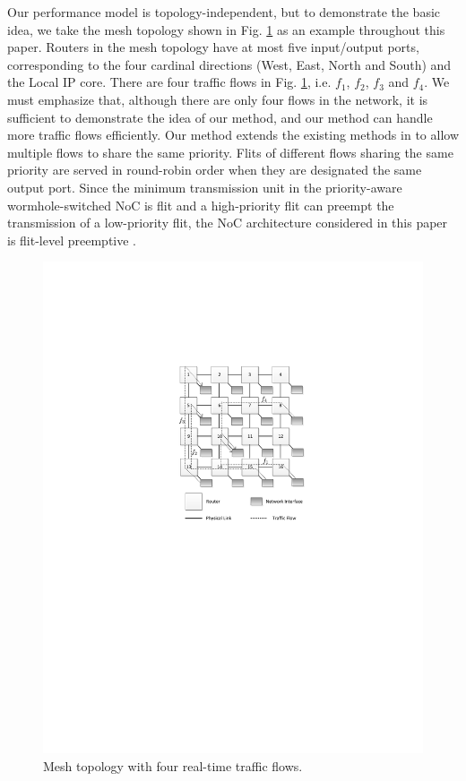\documentclass[preprint]{elsarticle}
\begin{document}
Our performance model is topology-independent, but to demonstrate the basic idea, we take the mesh topology shown in Fig. \ref{topology} as an example throughout this paper. Routers in the mesh topology have at most five input/output ports, corresponding to the four cardinal directions (West, East, North and South) and the Local IP core. There are four traffic flows in Fig. \ref{topology}, i.e. $f_1$, $f_2$, $f_3$ and $f_4$. We must emphasize that, although there are only four flows in the network, it is sufficient to demonstrate the idea of our method, and our method can handle more traffic flows efficiently. Our method extends the existing methods in \cite{73}\cite{Qian489900} to allow multiple flows to share the same priority. Flits of different flows sharing the same priority are served in round-robin order when they are designated the same output port. Since the minimum transmission unit in the priority-aware wormhole-switched NoC is flit and a high-priority flit can preempt the transmission of a low-priority flit, the NoC architecture considered in this paper is flit-level preemptive \cite{Lee:2003:RWC:846077.846083}.
\begin{figure}
  \centering
  \includegraphics[scale=0.85]{figures/mesh.pdf}
  \caption{Mesh topology with four real-time traffic flows.}\label{topology}
\end{figure}
\end{document}
